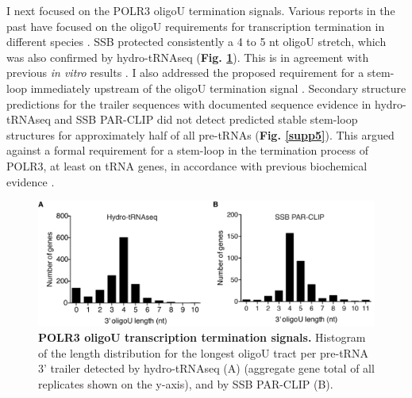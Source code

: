 \documentclass[12pt]{rockefeller}
\begin{document}
I next focused on the POLR3 oligoU termination signals. Various reports in the past have focused on the oligoU requirements for transcription termination in different species \cite{Nielsen:2013be,Arimbasseri:2014hj}. SSB protected consistently a 4 to 5 nt oligoU stretch, which was also confirmed by hydro-tRNAseq (\textbf{Fig. \ref{paper6de}}). This is in agreement with previous \textit{in vitro} results \cite{Bayfield:2009cx,Stefano:1984wp,Teplova:2006dv}. I also addressed the proposed requirement for a stem-loop immediately upstream of the oligoU termination signal \cite{Nielsen:2013be}. Secondary structure predictions for the trailer sequences with documented sequence evidence in hydro-tRNAseq and SSB PAR-CLIP did not detect predicted stable stem-loop structures for approximately half of all pre-tRNAs (\textbf{Fig. \ref{supp5}}). This argued against a formal requirement for a stem-loop in the termination process of POLR3, at least on tRNA genes, in accordance with previous biochemical evidence \cite{Arimbasseri:2014hj}.


\begin{figure}[!ht]%
\centering
\includegraphics[width=\textwidth]{paper6de.png}%
\caption[POLR3 oligoU transcription termination signals]
{\textbf{POLR3 oligoU transcription termination signals.}
Histogram of the length distribution for the longest oligoU tract per pre-tRNA 3’ trailer detected by hydro-tRNAseq (A) (aggregate gene total of all replicates shown on the y-axis), and by SSB PAR-CLIP (B).}
\centering
\label{paper6de}%
\end{figure}
\end{document}

